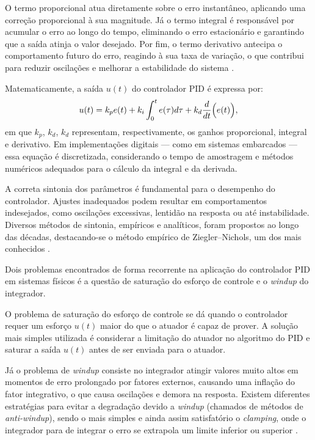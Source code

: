 \documentclass{article}
\begin{document}
O termo proporcional atua diretamente sobre o erro instantâneo, aplicando uma correção proporcional à sua magnitude. 
Já o termo integral é responsável por acumular o erro ao longo do tempo, eliminando o erro estacionário e garantindo
que a saída atinja o valor desejado. Por fim, o termo derivativo antecipa o comportamento futuro do erro, reagindo à sua taxa de 
variação, o que contribui para reduzir oscilações e melhorar a estabilidade do sistema \cite{nise2011control}.

Matematicamente, a saída $u(t)$  do controlador PID é expressa por:
\begin{align}
    u(t) = k_pe(t) + k_i\int^t_0e(\tau)d\tau + k_d\frac{d}{dt}\Bigr(e(t)\Bigl),
\end{align}
em que $k_p$, $k_d$, $k_d$ representam, respectivamente, os ganhos proporcional, integral e derivativo. Em implementações digitais — como em sistemas embarcados — essa equação é discretizada, considerando o tempo de amostragem e métodos numéricos adequados para o cálculo da integral e da derivada.

A correta sintonia dos parâmetros é fundamental para o desempenho do controlador. Ajustes inadequados podem resultar em comportamentos indesejados, como oscilações excessivas, lentidão na resposta ou
até instabilidade. Diversos métodos de sintonia, empíricos e analíticos, foram propostos ao longo das décadas, destacando-se o método empírico de Ziegler–Nichols, um dos mais conhecidos
\cite{ziegler1942optimum}.

Dois problemas encontrados de forma recorrente na aplicação do controlador PID em sistemas físicos é a questão de saturação do esforço de controle e o \emph{windup} do integrador. 

O problema de saturação do esforço de controle se dá quando o controlador requer um esforço $u(t)$ maior do que o atuador é capaz de prover. A solução mais simples utilizada é considerar a limitação
do atuador no algoritmo do PID e saturar a saída $u(t)$ antes de ser enviada para o atuador. 

Já o problema de
\emph{windup} consiste no integrador atingir valores muito altos em momentos de erro prolongado por fatores externos, causando uma inflação do
fator integrativo, o que causa oscilações e demora na resposta. Existem diferentes estratégias para evitar a degradação devido a \emph{windup} (chamados de métodos de \emph{anti-windup}), sendo o mais
simples e ainda assim satisfatório o \emph{clamping}, onde o integrador para de integrar o erro se extrapola um limite inferior ou superior \cite{amiri2024antiwindup}.
\newpage
\end{document}
